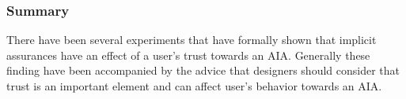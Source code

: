 \subsubsection{Summary}
There have been several experiments that have formally shown that implicit assurances have an effect of a user's trust towards an AIA. Generally these finding have been accompanied by the advice that designers should consider that trust is an important element and can affect user's behavior towards an AIA.
